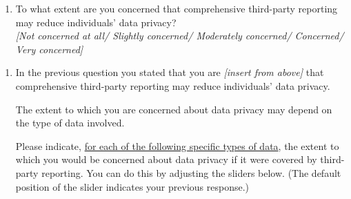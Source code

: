 \documentclass[11pt]{article}
\begin{document}
\begin{enumerate}[resume]    
    \item \label{question:tprdataprivacy} To what extent are you concerned that comprehensive third-party reporting may reduce individuals’ data privacy? \\
    \textit{[Not concerned at all/ Slightly concerned/ Moderately concerned/ Concerned/ Very concerned]}
\end{enumerate}
\begin{enumerate}[resume]
    \item \label{question:tprdataprivacycondition} In the previous question you stated that you are \textit{[insert from above]} that comprehensive third-party reporting may reduce individuals’ data privacy.

    \noindent The extent to which you are concerned about data privacy may depend on the type of data involved.

    \noindent Please indicate, \uline{for each of the following specific types of data}, the extent to which you would be concerned about data privacy if it were covered by third-party reporting. You can do this by adjusting the sliders below. (The default position of the slider indicates your previous response.)


\end{enumerate}
\end{document}
